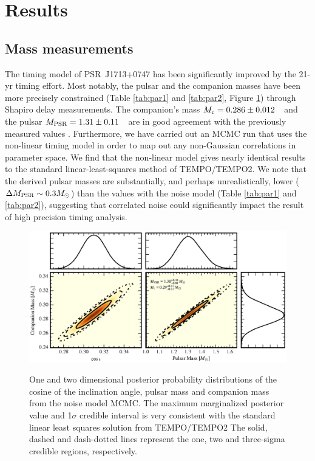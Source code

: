 \section{Results}
\label{sec:res}

\subsection{Mass measurements}
\label{sec:mass}
The timing model of PSR~J1713+0747 has been significantly improved by the 21-yr timing effort.
Most notably, the pulsar and the companion masses have been more precisely
constrained (Table \ref{tab:par1} and \ref{tab:par2}, Figure \ref{fig:masses}) through Shapiro delay measurements. The
companion's mass $M_{\rm c} = 0.286\pm0.012$~\Msun\, and the pulsar $M_{\rm
PSR}=1.31\pm0.11$~\Msun\, are in good agreement with the previously measured
values \citep{sns+05}. Furthermore, we have carried out an MCMC run that uses the non-linear timing
model in order to map out any non-Gaussian correlations in parameter space. We find that the non-linear
model gives nearly identical results to the standard linear-least-squares
method of \textsc{TEMPO}/\textsc{TEMPO2}.
We note that the derived pulsar masses are substantially, and perhaps
unrealistically, lower ($\Delta M_{\rm PSR} \sim 0.3 M_{\odot}$) than the
values with the noise model (Table \ref{tab:par1} and \ref{tab:par2}), suggesting that
correlated noise could significantly impact the result of high
precision timing analysis.

\begin{figure}[!ht]
\centering
\includegraphics[scale=1]{1713_masses_color.eps} \\ 
\caption {\label{fig:masses}  One and two dimensional posterior probability
distributions of the cosine of the inclination
angle, pulsar mass and companion mass from the noise model MCMC. The maximum marginalized posterior
value and 1$\sigma$ credible interval is very consistent with the standard linear least
squares solution from \textsc{TEMPO}/\textsc{TEMPO2} The solid, dashed and dash-dotted lines represent the one, two and three-sigma credible regions, respectively.
} 
\end{figure} 


